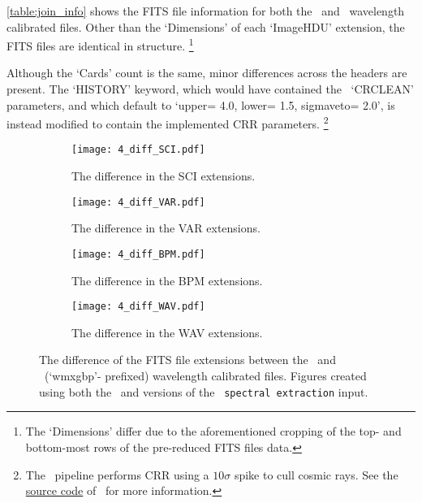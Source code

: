

\autoref{table:join_info} shows the \gls{FITS} file information for both the \polsalt\ and \stops\ wavelength calibrated files.
Other than the `Dimensions' of each `ImageHDU' extension, the \gls{FITS} files are identical in structure.%
\footnote{The `Dimensions' differ due to the aforementioned cropping of the top- and bottom-most rows of the pre-reduced \gls{FITS} files data.}

Although the `Cards' count is the same, minor differences across the headers are present.
The `HISTORY' keyword, which would have contained the \polsalt\ `CRCLEAN' parameters, and which default to `upper= 4.0, lower= 1.5, sigmaveto= 2.0', is instead modified to contain the implemented \gls{CRR} parameters.%
\footnote{The \polsalt\ pipeline performs \gls{CRR} using a $10\sigma$ spike to cull cosmic rays. See the \protect\href{https://github.com/saltastro/polsalt/blob/master/polsalt/specpolwavmap.py\#L132}{source code} of \polsalt\ for more information.}

\begin{figure}
    \centering
    \begin{subfigure}[b]{\textwidth}
        \centering
        \texttt{[image: 4\_diff\_SCI.pdf]}
        \caption{The difference in the \gls{SCI} extensions.}
        \label{subfig:join_SCI}
    \end{subfigure}
    \hfill
    \begin{subfigure}[b]{\textwidth}
        \centering
        \texttt{[image: 4\_diff\_VAR.pdf]}
        \caption{The difference in the \gls{VAR} extensions.}
        \label{subfig:join_VAR}
    \end{subfigure}
    \hfill
    \begin{subfigure}[b]{\textwidth}
        \centering
        \texttt{[image: 4\_diff\_BPM.pdf]}
        \caption{The difference in the \gls{BPM} extensions.}
        \label{subfig:join_BPM}
    \end{subfigure}
    \hfill
    \begin{subfigure}[b]{\textwidth}
        \centering
        \texttt{[image: 4\_diff\_WAV.pdf]}
        \caption{The difference in the \gls{WAV} extensions.}
        \label{subfig:join_WAV}
    \end{subfigure}
    \caption{The difference of the \gls{FITS} file extensions between the \polsalt\ and \stops\ (`wmxgbp'- prefixed) wavelength calibrated files. Figures created using both the \polsalt\ and \stops versions of the \polsalt\ \texttt{spectral extraction} input.}
    \label{fig:join_in_out_diff}
\end{figure}


